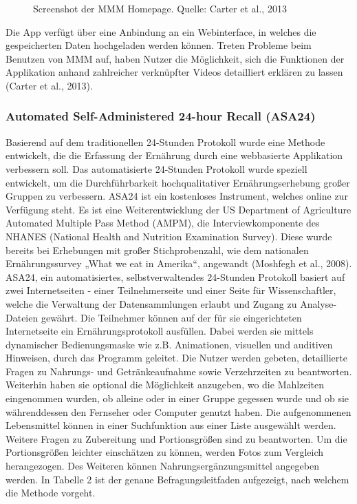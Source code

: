 \begin{figure}[h]
	\caption[Screenshot der MMM Homepage]{Screenshot der MMM Homepage. Quelle: Carter et al., 2013}
	\label{bild2}
\end{figure}


Die App verfügt über eine Anbindung an ein Webinterface, in welches die gespeicherten Daten hochgeladen werden können. Treten Probleme beim Benutzen von MMM auf, haben Nutzer die Möglichkeit, sich die Funktionen der Applikation anhand zahlreicher verknüpfter Videos detailliert erklären zu lassen (Carter et al., 2013).



\subsubsection{Automated Self-Administered 24-hour Recall (ASA24)}

Basierend auf dem traditionellen 24-Stunden Protokoll wurde eine Methode entwickelt, die die Erfassung der Ernährung durch eine webbasierte Applikation verbessern soll. Das automatisierte 24-Stunden Protokoll wurde speziell entwickelt, um die Durchführbarkeit hochqualitativer Ernährungserhebung großer Gruppen zu verbessern. ASA24 ist ein kostenloses Instrument, welches online zur Verfügung steht. Es ist eine Weiterentwicklung der US Department of Agriculture Automated Multiple Pass Method (AMPM), die Interviewkomponente des NHANES (National Health and Nutrition Examination Survey). Diese wurde bereits bei Erhebungen mit großer Stichprobenzahl, wie dem nationalen Ernährungssurvey „What we eat in Amerika“, angewandt (Moshfegh et al., 2008).  ASA24, ein automatisiertes, selbstverwaltendes 24-Stunden Protokoll basiert auf zwei Internetseiten - einer Teilnehmerseite und einer Seite für  Wissenschaftler, welche die Verwaltung der Datensammlungen erlaubt und Zugang zu Analyse-Dateien gewährt. Die Teilnehmer können auf der für sie eingerichteten Internetseite ein Ernährungsprotokoll ausfüllen. Dabei werden sie mittels dynamischer Bedienungsmaske wie z.B. Animationen, visuellen und auditiven Hinweisen, durch das Programm geleitet. Die Nutzer werden gebeten, detaillierte Fragen zu Nahrungs- und Getränkeaufnahme sowie Verzehrzeiten zu beantworten. Weiterhin haben sie optional die Möglichkeit anzugeben, wo die Mahlzeiten eingenommen wurden, ob alleine oder in einer Gruppe gegessen wurde und ob sie währenddessen den Fernseher oder Computer genutzt haben. Die aufgenommenen Lebensmittel können in einer Suchfunktion aus einer Liste ausgewählt werden. Weitere Fragen zu Zubereitung und Portionsgrößen sind zu beantworten. Um die Portionsgrößen leichter einschätzen zu können, werden Fotos zum Vergleich herangezogen. Des Weiteren können Nahrungsergänzungsmittel angegeben werden. In Tabelle 2 ist der genaue Befragungsleitfaden aufgezeigt, nach welchem die Methode vorgeht. 

